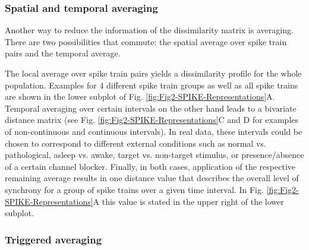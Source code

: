 \documentclass[10pt,twocolumn]{elsart5p}
\begin{document}
\subsubsection{\label{sss:Spatial-and-temporal-Averaging} Spatial and temporal averaging}

Another way to reduce the information of the dissimilarity matrix is averaging. There are two possibilities that commute: the spatial average over spike train pairs and the temporal average.

The local average over spike train pairs yields a dissimilarity profile for the whole population. Examples for $4$ different spike train groups as well as all spike trains are shown in the lower subplot of Fig. \ref{fig:Fig2-SPIKE-Representations}A. Temporal averaging over certain intervals on the other hand leads to a bivariate distance matrix (see Fig. \ref{fig:Fig2-SPIKE-Representations}C and D for examples of non-continuous and continuous intervals). In real data, these intervals could be chosen to correspond to different external conditions such as normal vs. pathological, asleep vs. awake, target vs. non-target stimulus, or presence/absence of a certain channel blocker. Finally, in both cases, application of the respective remaining average results in one distance value that describes the overall level of synchrony for a group of spike trains over a given time interval. In Fig. \ref{fig:Fig2-SPIKE-Representations}A this value is stated in the upper right of the lower subplot.

\subsubsection{\label{sss:Triggered-Averaging} Triggered averaging}
\end{document}
